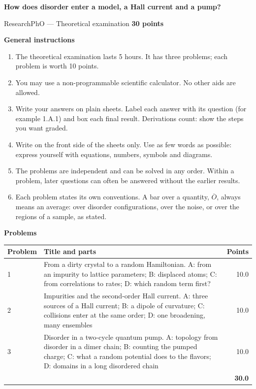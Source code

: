 \documentclass[11pt,a4paper]{article}
\newcommand{\avg}[1]{\overline{#1}}
\newcommand{\smallheading}[1]{\par\Needspace{6\baselineskip}\medskip\textbf{#1}\par}
\begin{document}
{\LARGE\bfseries\color{ink}How does disorder enter a model, a Hall current and a pump?}\par
{\large ResearchPhO --- Theoretical examination \hfill \textbf{30 points}}

\smallheading{General instructions}
\begin{enumerate}[leftmargin=7mm,itemsep=3pt]
\item The theoretical examination lasts 5 hours. It has three problems; each problem is worth 10 points.
\item You may use a non-programmable scientific calculator. No other aids are allowed.
\item Write your answers on plain sheets. Label each answer with its question (for example 1.A.1) and box each final result. Derivations count: show the steps you want graded.
\item Write on the front side of the sheets only. Use as few words as possible: express yourself with equations, numbers, symbols and diagrams.
\item The problems are independent and can be solved in any order. Within a problem, later questions can often be answered without the earlier results.
\item Each problem states its own conventions. A bar over a quantity, $\avg{O}$, always means an average: over disorder configurations, over the noise, or over the regions of a sample, as stated.
\end{enumerate}

\smallheading{Problems}
{\small\begin{tabularx}{\textwidth}{@{}p{18mm}Y r@{}}\toprule
Problem&Title and parts&Points\\&From a dirty crystal to a random Hamiltonian. A: from an impurity to lattice parameters; B: displaced atoms; C: from correlations to rates; D: which random term first?&10.0\\
2&Impurities and the second-order Hall current. A: three sources of a Hall current; B: a dipole of curvature; C: collisions enter at the same order; D: one broadening, many ensembles&10.0\\
3&Disorder in a two-cycle quantum pump. A: topology from disorder in a dimer chain; B: counting the pumped charge; C: what a random potential does to the flavors; D: domains in a long disordered chain&10.0\\\midrule
&&\textbf{30.0}\\\bottomrule
\end{tabularx}}
\end{document}
